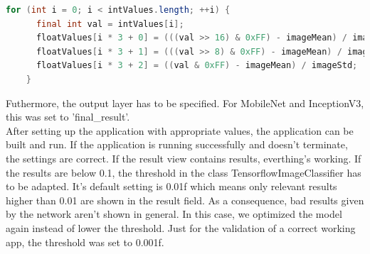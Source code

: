 \begin{lstlisting}[caption=Conversion of image data integer to float, label=list:int_conversion, language=java]
	for (int i = 0; i < intValues.length; ++i) {
      final int val = intValues[i];
      floatValues[i * 3 + 0] = (((val >> 16) & 0xFF) - imageMean) / imageStd;
      floatValues[i * 3 + 1] = (((val >> 8) & 0xFF) - imageMean) / imageStd;
      floatValues[i * 3 + 2] = ((val & 0xFF) - imageMean) / imageStd;
    }
\end{lstlisting}

Futhermore, the output layer has to be specified. For MobileNet and InceptionV3, this was set to 'final_result'. \\

After setting up the application with appropriate values, the application can be built and run. If the application is running successfully and doesn't terminate, the settings are correct. If the result view contains results, everthing's working. If the results are below 0.1, the threshold in the class TensorflowImageClassifier has to be adapted. It's default setting is 0.01f which means only relevant results higher than 0.01 are shown in the result field. As a consequence, bad results given by the network aren't shown in general. In this case, we optimized the model again instead of lower the threshold. Just for the validation of a correct working app, the threshold was set to 0.001f.